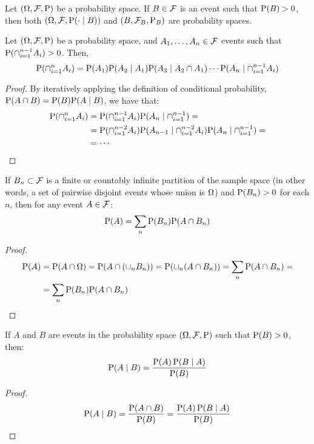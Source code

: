 \begin{prop}
	Let $(\O, \F, \P)$ be a probability space. If $B \in \F$ is an event such that $\P(B) > 0$, then both $(\O, \F, \P(\cdot \mid B))$ and $(B, \F_B, \P_B)$ are probability spaces.
\end{prop}

\begin{prop}
	Let $\PS$ be a probability space, and $A_1, \ldots, A_n \in \F$ events such that $\P(\cap_{i = 1}^{n - 1} A_i) > 0$. Then,
	\[
		\P(\cap_{i = 1}^{n} A_i) = \P(A_1) \P(A_2 \mid A_1) \P(A_3 \mid A_2 \cap A_1) \cdots \P(A_n \mid \cap_{i = 1}^{n - 1} A_i)
	\]
\end{prop}
\begin{proof}
	By iteratively applying the definition of conditional probability, $\P(A \cap B) = \P(B) \P(A \mid B)$, we have that:
	\begin{align*}
		\P(\cap_{i = 1}^{n} A_i) &= \P(\cap_{i = 1}^{n - 1} A_i)\P(A_n \mid \cap_{i = 1}^{n - 1}) = \\
		 &= \P(\cap_{i = 1} ^{n - 2} A_i) \P(A_{n - 1} \mid \cap_{i = 1} ^{n - 2} A_i) \P(A_n \mid \cap_{i = 1}^{n - 1}) = \\
		 &= \cdots
	\end{align*}
\end{proof}

\begin{prop}
	If ${B_n} \subset \F$ is a finite or countably infinite partition of the sample space (in other words, a set of pairwise disjoint events whose union is $\O$) and $\P(B_n) > 0$ for each $n$, then for any event $A \in \F$:
	\[
		\P(A) = \sum_n \P(B_n) \P(A \cap B_n)
	\]
\end{prop}
\begin{proof}
	\begin{align*}
		\P(A) &= \P(A \cap \O) = \P(A \cap (\cup_n B_n)) = \P(\cup_n (A \cap B_n)) = \sum_n \P(A \cap B_n) = \\ &= \sum_n \P(B_n) \P(A \cap B_n)
	\end{align*}
\end{proof}

\begin{prop}
	If $A$ and $B$ are events in the probability space $\PS$ such that $\P(B) > 0$, then:
	\[
		\P(A \mid B) = \frac{\P(A) \, \P(B \mid A)}{\P(B)}
	\]
\end{prop}

\begin{proof}
	\[
		\P(A \mid B) = \frac{\P(A \cap B)}{\P(B)} = \frac{\P(A) \, \P(B \mid A)}{\P(B)}
	\]
\end{proof}

